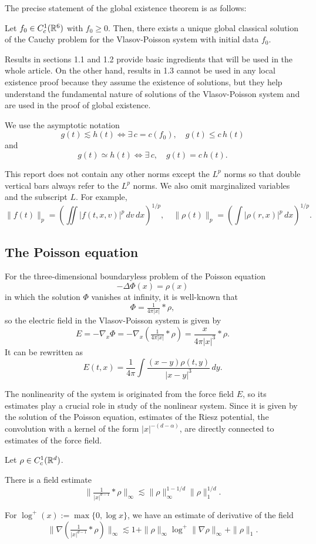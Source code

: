 \documentclass{article}
\begin{document}
The precise statement of the global existence theorem is as follows:
\begin{thm}
Let $f_0\in C_c^1(\mathbb{R}^6)$ with $f_0\ge0$.
Then, there exists a unique global classical solution of the Cauchy problem for the Vlasov-Poisson system with initial data $f_0$.
\end{thm}

Results in sections 1.1 and 1.2 provide basic ingredients that will be used in the whole article.
On the other hand, results in 1.3 cannot be used in any local existence proof because they assume the existence of solutions, but they help understand the fundamental nature of solutions of the Vlasov-Poisson system and are used in the proof of global existence.

\begin{notn*}
We use the asymptotic notation
\[g(t)\lesssim h(t)\iff\exists\,c=c(f_0),\quad g(t)\le c\,h(t)\]
and
\[g(t)\simeq h(t)\iff\exists\,c,\quad g(t)=c\,h(t).\]

This report does not contain any other norms except the $L^p$ norms so that double vertical bars always refer to the $L^p$ norms.
We also omit marginalized variables and the subscript $L$.
For example,
\[\|f(t)\|_p=(\iint|f(t,x,v)|^p\,dv\,dx)^{1/p},\quad\|\rho(t)\|_p=(\int|\rho(r,x)|^p\,dx)^{1/p}.\]
\end{notn*}



\subsection{The Poisson equation}
For the three-dimensional boundaryless problem of the Poisson equation
\[-\Delta\Phi(x)=\rho(x)\]
in which the solution $\Phi$ vanishes at infinity, it is well-known that
\[\Phi=\tfrac1{4\pi|x|}*\rho,\]
so the electric field in the Vlasov-Poisson system is given by
\[E=-\nabla_x\Phi=-\nabla_x(\tfrac1{4\pi|x|}*\rho)=\frac{x}{4\pi|x|^3}*\rho.\]
It can be rewritten as
\[E(t,x)=\frac1{4\pi}\int\frac{(x-y)\rho(t,y)}{|x-y|^3}\,dy.\]

The nonlinearity of the system is originated from the force field $E$, so its estimates play a crucial role in study of the nonlinear system.
Since it is given by the solution of the Poisson equation, estimates of the Riesz potential, the convolution with a kernel of the form $|x|^{-(d-\alpha)}$, are directly connected to estimates of the force field.

\begin{lem}
Let $\rho\in C_c^1(\mathbb{R}^d)$.
\begin{parts}
\item
There is a field estimate
\[\|\tfrac1{|x|^{d-1}}*\rho\|_\infty\lesssim\|\rho\|_\infty^{1-1/d}\|\rho\|_1^{1/d}.\]
\item
For $\log^+(x):=\max\{0,\log x\}$, we have an estimate of derivative of the field
\[\|\nabla(\tfrac1{|x|^{d-1}}*\rho)\|_\infty\lesssim1+\|\rho\|_\infty\log^+\|\nabla\rho\|_\infty+\|\rho\|_1.\]
\end{parts}
\end{lem}
\end{document}
